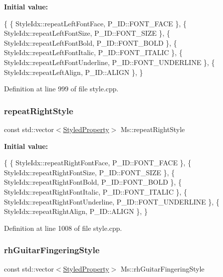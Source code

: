 {\bfseries Initial value\+:}
\begin{DoxyCode}
\{
      \{ StyleIdx::repeatLeftFontFace,                 P\_ID::FONT\_FACE              \},
      \{ StyleIdx::repeatLeftFontSize,                 P\_ID::FONT\_SIZE              \},
      \{ StyleIdx::repeatLeftFontBold,                 P\_ID::FONT\_BOLD              \},
      \{ StyleIdx::repeatLeftFontItalic,               P\_ID::FONT\_ITALIC            \},
      \{ StyleIdx::repeatLeftFontUnderline,            P\_ID::FONT\_UNDERLINE         \},
      \{ StyleIdx::repeatLeftAlign,                    P\_ID::ALIGN                  \},
      \}
\end{DoxyCode}


Definition at line 999 of file style.\+cpp.

\mbox{\label{namespace_ms_a03b87f823c02a8d6416c0fc08709bf25}} 
\subsubsection{\texorpdfstring{repeat\+Right\+Style}{repeatRightStyle}}
{\footnotesize\ttfamily const std\+::vector$<$\hyperlink{struct_ms_1_1_styled_property}{Styled\+Property}$>$ Ms\+::repeat\+Right\+Style}

{\bfseries Initial value\+:}
\begin{DoxyCode}
\{
      \{ StyleIdx::repeatRightFontFace,                P\_ID::FONT\_FACE              \},
      \{ StyleIdx::repeatRightFontSize,                P\_ID::FONT\_SIZE              \},
      \{ StyleIdx::repeatRightFontBold,                P\_ID::FONT\_BOLD              \},
      \{ StyleIdx::repeatRightFontItalic,              P\_ID::FONT\_ITALIC            \},
      \{ StyleIdx::repeatRightFontUnderline,           P\_ID::FONT\_UNDERLINE         \},
      \{ StyleIdx::repeatRightAlign,                   P\_ID::ALIGN                  \},
      \}
\end{DoxyCode}


Definition at line 1008 of file style.\+cpp.

\mbox{\label{namespace_ms_a537e93e28a75f4bfdce4a3ac79670ea1}} 
\subsubsection{\texorpdfstring{rh\+Guitar\+Fingering\+Style}{rhGuitarFingeringStyle}}
{\footnotesize\ttfamily const std\+::vector$<$\hyperlink{struct_ms_1_1_styled_property}{Styled\+Property}$>$ Ms\+::rh\+Guitar\+Fingering\+Style}

